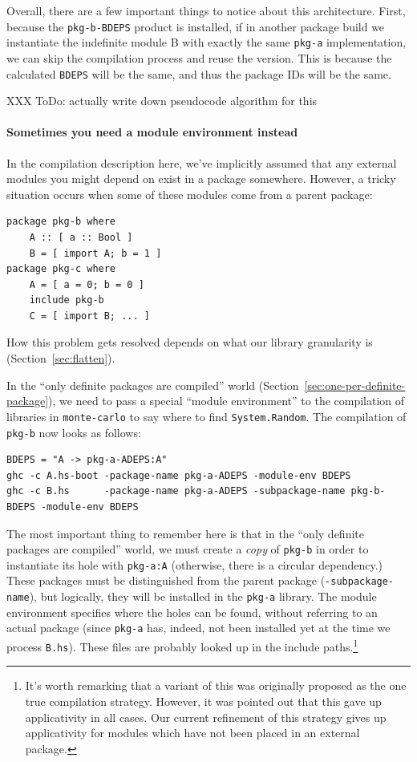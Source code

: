 \documentclass{article}
\begin{document}
Overall, there are a few important things to notice about this architecture.
First, because the \verb|pkg-b-BDEPS| product is installed, if in another package
build we instantiate the indefinite module B with exactly the same \verb|pkg-a|
implementation, we can skip the compilation process and reuse the version.
This is because the calculated \verb|BDEPS| will be the same, and thus the package
IDs will be the same.

XXX ToDo: actually write down pseudocode algorithm for this

\paragraph{Sometimes you need a module environment instead}  In the compilation
description here, we've implicitly assumed that any external modules you might
depend on exist in a package somewhere.  However, a tricky situation
occurs when some of these modules come from a parent package:
\begin{verbatim}
package pkg-b where
    A :: [ a :: Bool ]
    B = [ import A; b = 1 ]
package pkg-c where
    A = [ a = 0; b = 0 ]
    include pkg-b
    C = [ import B; ... ]
\end{verbatim}

How this problem gets resolved depends on what our library granularity is (Section~\ref{sec:flatten}).

In the ``only definite packages are compiled'' world
(Section~\ref{sec:one-per-definite-package}), we need to pass a
special ``module environment'' to the compilation of libraries
in \verb|monte-carlo| to say where to find \verb|System.Random|.
The compilation of \verb|pkg-b| now looks as follows:

\begin{verbatim}
BDEPS = "A -> pkg-a-ADEPS:A"
ghc -c A.hs-boot -package-name pkg-a-ADEPS -module-env BDEPS
ghc -c B.hs      -package-name pkg-a-ADEPS -subpackage-name pkg-b-BDEPS -module-env BDEPS
\end{verbatim}

The most important thing to remember here is that in the ``only definite
packages are compiled'' world, we must create a \emph{copy} of
\verb|pkg-b| in order to instantiate its hole with \verb|pkg-a:A|
(otherwise, there is a circular dependency.)  These packages must be
distinguished from the parent package (\verb|-subpackage-name|), but
logically, they will be installed in the \verb|pkg-a| library.  The
module environment specifies where the holes can be found, without
referring to an actual package (since \verb|pkg-a| has, indeed, not been
installed yet at the time we process \verb|B.hs|).  These files are
probably looked up in the include paths.\footnote{It's worth remarking
    that a variant of this was originally proposed as the one true
    compilation strategy.  However, it was pointed out that this gave up
    applicativity in all cases.  Our current refinement of this strategy
gives up applicativity for modules which have not been placed in an
external package.}
\end{document}
